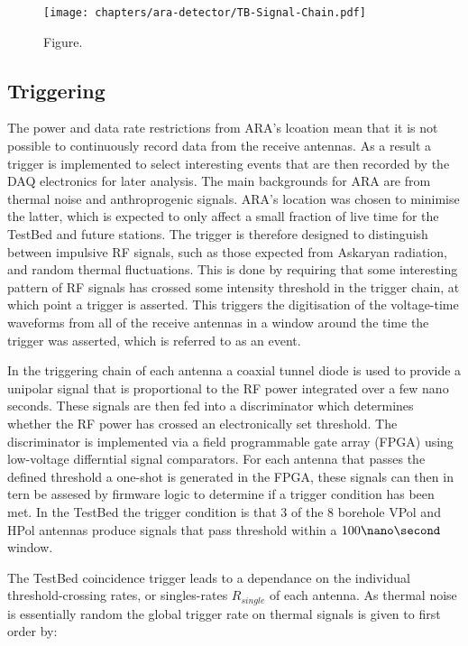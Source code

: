 \begin{figure}[htpb]
  \centering
  \texttt{[image: chapters/ara-detector/TB-Signal-Chain.pdf]}
  \caption{Figure.}
  \label{fig:ara-detector:TestBed:Signal-Chain}
\end{figure}





\subsection{Triggering}
\label{sec:ara-detector:TestBed:Triggering}

The power and data rate restrictions from ARA's lcoation mean that it is not possible to continuously record data from the receive antennas. As a result a trigger is implemented to select interesting events that are then recorded by the DAQ electronics for later analysis. The main backgrounds for ARA are from thermal noise and anthroprogenic signals. ARA's location was chosen to minimise the latter, which is expected to only affect a small fraction of live time for the TestBed and future stations. The trigger is therefore designed to distinguish between impulsive RF signals, such as those expected from Askaryan radiation, and random thermal fluctuations. This is done by requiring that some interesting pattern of RF signals has crossed some intensity threshold in the trigger chain, at which point a trigger is asserted. This triggers the digitisation of the voltage-time waveforms from all of the receive antennas in a window around the time the trigger was asserted, which is referred to as an event.

In the triggering chain of each antenna a coaxial tunnel diode is used to provide a unipolar signal that is proportional to the RF power integrated over a few nano seconds. These signals are then fed into a discriminator which determines whether the RF power has crossed an electronically set threshold. The discriminator is implemented via a field programmable gate array (FPGA) using low-voltage differntial signal comparators. For each antenna that passes the defined threshold a one-shot is generated in the FPGA, these signals can then in tern be assesed by firmware logic to determine if a trigger condition has been met. In the TestBed the trigger condition is that 3 of the 8 borehole VPol and HPol antennas produce signals that pass threshold within a $100 \nano\second$ window. 

The TestBed coincidence trigger leads to a dependance on the individual threshold-crossing rates, or singles-rates $R_{single}$ of each antenna. As thermal noise is essentially random the global trigger rate on thermal signals is given to first order by:


